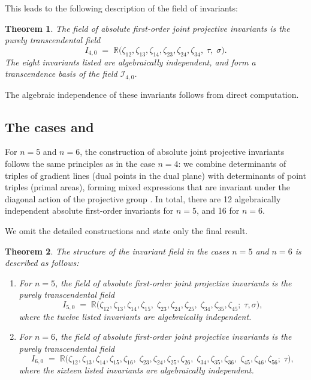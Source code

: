 \documentclass[12pt,reqno]{amsart}
\newtheorem{theorem}{Theorem}
\begin{document}
This leads to the following description of the field of invariants:
\begin{theorem}
The field of absolute first-order joint projective invariants is the purely transcendental field
\[
I_{4,0} \;=\;
\mathbb{R}\bigl(
  \zeta_{12},\zeta_{13},\zeta_{14},\zeta_{23},\zeta_{24},\zeta_{34},\;
  \tau,\;\sigma
\bigr).
\]
The eight invariants listed are algebraically independent, and form a transcendence basis of the field \(\mathcal I_{4,0}\).
\end{theorem}


The algebraic independence of these invariants follows from direct computation.




\subsection{The cases  and }

For $n=5$ and $n=6$, the construction of absolute joint projective invariants follows the same principles as in the case $n=4$: we combine determinants of triples of gradient lines (dual points in the dual plane) with determinants of point triples (primal areas), forming mixed expressions that are invariant under the diagonal action of the projective group .
In total, there are 12 algebraically independent absolute first-order invariants for \(n = 5\), and 16 for \(n = 6\).

We omit the detailed constructions and state only the final result.

\begin{theorem}
The structure of the invariant field in the cases \(n = 5\) and \(n = 6\) is described as follows:
\begin{enumerate}\itemsep=1em

\item[\textnormal{(i)}] For $n=5$, the field of absolute first-order joint projective invariants is the purely transcendental field
\[
I_{5,0}
 \;=\;
 \mathbb{R}\!\bigl(
   \zeta_{12},\zeta_{13},\zeta_{14},\zeta_{15},\;
   \zeta_{23},\zeta_{24},\zeta_{25},\;
   \zeta_{34},\zeta_{35},\zeta_{45};\;
   \tau,\sigma
 \bigr),
\]
where the twelve listed invariants are algebraically independent.

\item[\textnormal{(ii)}] For $n=6$, the field of absolute first-order joint projective invariants is the purely transcendental field
\[
I_{6,0}
 \;=\;
 \mathbb{R}\!\bigl(
   \zeta_{12},\zeta_{13},\zeta_{14},\zeta_{15},\zeta_{16},\;
   \zeta_{23},\zeta_{24},\zeta_{25},\zeta_{26},\;
   \zeta_{34},\zeta_{35},\zeta_{36},\;
   \zeta_{45},\zeta_{46},\zeta_{56};\;
   \tau
 \bigr),
\]
where the sixteen listed invariants are algebraically independent.
\end{enumerate}
\end{theorem}
\end{document}
